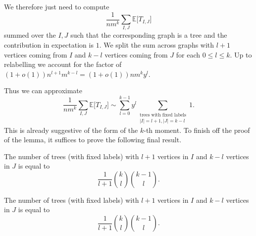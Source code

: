 \documentclass[11pt,openany]{article}
\newcounter{thmcounter} %
\newcommand{\proposition}[1]{
	\addtocounter{thmcounter}{1}
	\begin{tcolorbox}[title=Proposition {\thesection}.{\arabic{thmcounter}},colframe=red!50!blue!20!white,colback=red!35!blue!10!white, coltitle=black]{#1}\end{tcolorbox}

}
\let\oldproposition\proposition
\renewcommand{\proposition}[2][\relax]{\ifx\relax#1\oldproposition{#2}\else \begin{aproposition}{}{#1} #2 \end{aproposition} \fi}
\begin{document}
We therefore just need to compute \[
    \frac{1}{nm^k}\sum_{I,J}\mathbb{E}\Big[T_{I,J}\Big]
\]
summed over the $I,J$ such that the corresponding graph is a tree and the contribution in expectation is $1$. We split the sum across graphs with $l+1$ vertices coming from $I$ and $k-l$ vertices coming from $J$ for each $0 \leq l\leq k$.
Up to relabelling we account for the factor of $(1+o(1))n^{l+1}m^{k-l}=(1+o(1))nm^ky^l$.

Thus we can approximate \[
    \frac{1}{nm^k}\sum_{I,J}\mathbb{E}\Big[T_{I,J}\Big]\sim \sum_{l=0}^{k-1} y^l\sum_{\substack{\textrm{trees with fixed labels}\\
    |I|={l+1},|J|=k-l}}1.
\]
This is already suggestive of the form of the $k$-th moment. To finish off the proof of the lemma, it suffices to prove the following final result.
\proposition{
    The number of trees (with fixed labels) with $l+1$ vertices in $I$ and $k-l$ vertices in $J$ is equal to \[
    \frac{1}{l+1}\binom{k}{l}\binom{k-1}{l}.
    \]
}
\end{document}
